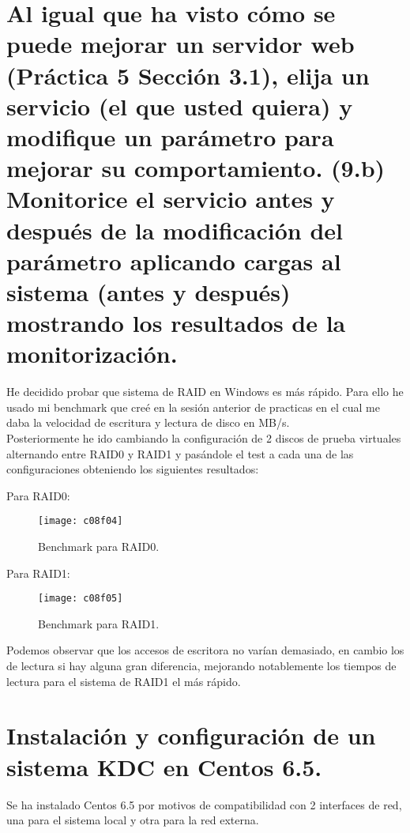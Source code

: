 \clearpage
\section{Al igual que ha visto cómo se puede mejorar un servidor web (Práctica 5 Sección 3.1), elija un servicio (el que usted quiera) y modifique un parámetro para mejorar su comportamiento. (9.b) Monitorice el servicio antes y después de	la modificación del parámetro aplicando cargas al sistema (antes y después) mostrando los resultados de la monitorización.}

He decidido probar que sistema de RAID en Windows es más rápido. Para ello he usado mi benchmark que creé en la sesión anterior de practicas en el cual me daba la velocidad de escritura y lectura de disco en MB/s.\\

Posteriormente he ido cambiando la configuración de 2 discos de prueba virtuales alternando entre RAID0 y RAID1 y pasándole el test a cada una de las configuraciones obteniendo los siguientes resultados:

Para RAID0:
\begin{figure}[H]
	\centering
	\texttt{[image: c08f04]}
	\caption{Benchmark para RAID0.}
	\label{fig:c08f04}
\end{figure}
\clearpage
Para RAID1:
\begin{figure}[H]
	\centering
	\texttt{[image: c08f05]}
	\caption{Benchmark para RAID1.}
	\label{fig:c08f05}
\end{figure}

Podemos observar que los accesos de escritora no varían demasiado, en cambio los de lectura si hay alguna gran diferencia, mejorando notablemente los tiempos de lectura para el sistema de RAID1 el más rápido.

\clearpage
\section{Instalación y configuración de un sistema KDC en Centos 6.5.}

Se ha instalado Centos 6.5 por motivos de compatibilidad con 2 interfaces de red, una para el sistema local y otra para la red externa.\\

